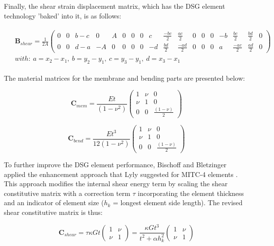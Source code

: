 Finally, the shear strain displacement matrix, which has the DSG element technology 'baked' into it, is as follows:

\begin{gather} 
	\begin{aligned}
		& \mathbf{B}_{shear} =  \frac{1}{2 A}
		\begin{pmatrix}
			0 & 0 & b-c & 0 & A & 0 & 0 & 0 & c & \frac{-bc}{2} & \frac{ac}{2} & 0 & 0 & 0 & -b & \frac{bc}{2} & \frac{bd}{2} & 0 \\
			0 & 0 & d-a & -A & 0 & 0 & 0 & 0 & -d & \frac{bd}{2} & \frac{-ad}{2} & 0 & 0 & 0 & a & \frac{-ac}{2} & \frac{ad}{2} & 0
		\end{pmatrix}
		\\
		& with:\ 
		a = x_2-x_1,\ 
		b = y_2-y_1,\ 
		c = y_3-y_1,\ 
		d = x_3 - x_1
		\label{eqt10}
	\end{aligned}
\end{gather}

The material matrices for the membrane and bending parts are presented below:

\begin{equation} 
\mathbf{C}_{mem} =  \frac{Et}{(1-\nu^2)}
\begin{pmatrix}
1 & \nu & 0 \\
\nu & 1 & 0 \\
0 & 0 & \frac{(1-\nu)}{2}
\end{pmatrix}
\label{eqt11}
\end{equation}

\begin{equation} 
\mathbf{C}_{bend} =  \frac{E t^3}{12(1-\nu^2)}
\begin{pmatrix}
1 & \nu & 0 \\
\nu & 1 & 0 \\
0 & 0 & \frac{(1-\nu)}{2}
\end{pmatrix}
\label{eqt12}
\end{equation}

To further improve the DSG element performance, Bischoff and Bletzinger \cite{Bis04} \cite{Bis01} applied the enhancement approach that Lyly suggested for MITC-4 elements \cite{Lyl93}. This approach modifies the internal shear energy term by scaling the shear constitutive matrix with a correction term $\tau$ incorporating the element thickness and an indicator of element size ($h_k$ = longest element side length). The revised shear constitutive matrix is thus:

\begin{equation} 
\mathbf{C}_{shear} =  \tau \kappa Gt
\begin{pmatrix}
1 & \nu \\
\nu & 1 
\end{pmatrix}
=
\frac{\kappa G t^3}{t^2 + \alpha h_k^2}
\begin{pmatrix}
1 & \nu \\
\nu & 1 
\end{pmatrix}
\label{eqt14}
\end{equation}

